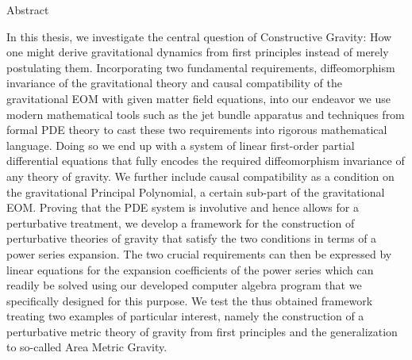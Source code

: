 \documentclass[a4paper,12pt, DIV=14, BCOR=5mm, twoside, headsepline, numbers=noenddot]{scrbook}
\newenvironment{abstract}{%
  \titlepage%
  \null\vfil%
  \begin{center}\normalfont\usekomafont{disposition}Abstract\end{center}%
}{%
  \par
  \vfil\null%
  \endtitlepage%
}
\begin{document}
\begin{abstract}
In this thesis, we investigate the central question of Constructive Gravity: 
How one might derive gravitational dynamics from first principles instead of merely postulating them. 
Incorporating two fundamental requirements, diffeomorphism invariance of the gravitational theory and causal compatibility of the gravitational EOM with given matter field equations, into our endeavor we use modern mathematical tools such as the jet bundle apparatus and techniques from formal PDE theory to cast these two requirements into rigorous mathematical language. Doing so we end up with a system of linear first-order partial differential equations that fully encodes the required diffeomorphism invariance of any theory of gravity. We further include causal compatibility as a condition on the gravitational Principal Polynomial, a certain sub-part of the gravitational EOM. 
Proving that the PDE system is involutive and hence allows for a perturbative treatment, we develop a framework for the construction of perturbative theories of gravity that satisfy the two conditions in terms of a power series expansion. The two crucial requirements can then be expressed by linear equations for the expansion coefficients of the power series which can readily be solved using our developed computer algebra program that we specifically designed for this purpose. We test the thus obtained framework treating two examples of particular interest, namely the construction of a perturbative metric theory of gravity from first principles and the generalization to so-called Area Metric Gravity.
\end{abstract}
\end{document}
